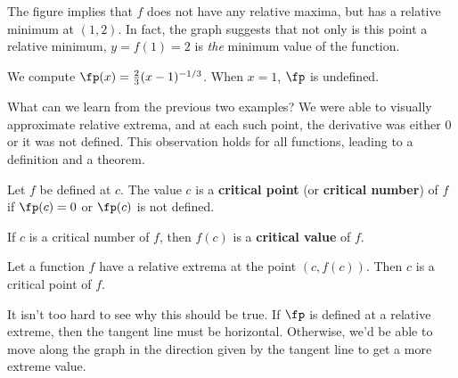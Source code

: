 {The figure implies that $f$ does not have any relative maxima, but has a relative minimum at $(1,2)$. In fact, the graph suggests that not only is this point a relative minimum, $y=f(1)=2$ is \textit{the} minimum value of the function.

We compute $\fp(x) = \frac23(x-1)^{-1/3}$. When $x=1$, $\fp$ is undefined.}

What can we learn from the previous two examples? We were able to visually approximate relative extrema, and at each such point, the derivative was either 0 or it was not defined. This observation holds for all functions, leading to a definition and a theorem.

%
{Let $f$ be defined at $c$. The value $c$ is a \textbf{critical point} (or \textbf{critical number}) of $f$ if $\fp(c)=0$ or $\fp(c)$ is not defined.\bigskip

If $c$ is a critical number of $f$, then $f(c)$ is a \textbf{critical value} of $f$.}

{Let a function $f$ have a relative extrema at the point $(c,f(c))$. Then $c$ is a critical point of $f$.}%

It isn't too hard to see why this should be true.  If $\fp$ is defined at a relative extreme, then the tangent line must be horizontal.  Otherwise, we'd be able to move along the graph in the direction given by the tangent line to get a more extreme value.


